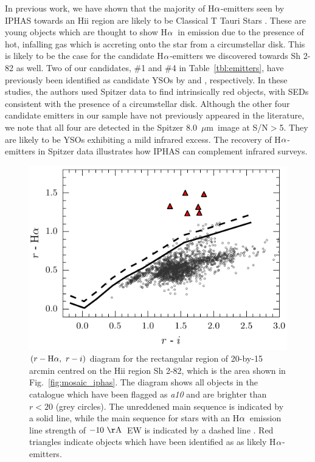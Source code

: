 \documentclass[a4paper,useAMS,usenatbib]{mn2e}
\def\ha{\mbox{H$\rm \alpha$}}
\def\micron{\mbox{$\mu$m}}
\begin{document}
In previous work, we have shown that the majority of
\ha-emitters seen by IPHAS towards an H{\sc ii} region
are likely to be Classical T Tauri Stars \citep{Barentsen2011a}.
These are young objects
which are thought to show \ha\ in emission
due to the presence of hot, infalling gas
which is accreting onto the star
from a circumstellar disk.
This is likely to be the case for the candidate \ha-emitters
we discovered towards Sh 2-82 as well.
Two of our candidates, \#1 and \#4 in Table~\ref{tbl:emitters},
have previously been identified
as candidate YSOs by \cite{Robitaille2008}
and \cite{Yu2012}, respectively.
In these studies, the authors used Spitzer data
to find intrinsically red objects,
with SEDs consistent with the presence of a circumstellar disk.
Although the other four candidate emitters in our sample
have not previously appeared in the literature,
we note that all four are detected
in the Spitzer 8.0~\micron\ image at S/N$>$5.
They are likely to be YSOs exhibiting a mild infrared excess.
The recovery of \ha-emitters in Spitzer
data illustrates how IPHAS can complement infrared surveys.

\begin{figure}
\begin{center}
  \includegraphics[width=\linewidth]{figures/sh2-82/sh2-82-ccd.pdf}
    \caption{$(r-\ha,\ r-i)$ diagram for the rectangular region of 
    20-by-15 arcmin centred on the H{\sc ii} region Sh 2-82,
    which is the area shown in Fig.~\ref{fig:mosaic_iphas}.    
    The diagram shows all objects in the catalogue
    which have been flagged as \emph{a10} and are brighter
    than $r<20$ (grey circles).
    The unreddened main sequence is indicated by a solid line,
    while the main sequence for stars with an \ha\ emission line
    strength of $-10~\rm{\AA}$~EW is indicated by a dashed line
    \citep[both based on the colour simulations by][]{Barentsen2011a}.
    Red triangles indicate objects which have been identified as
    as likely \ha-emitters.}
    \label{fig:emitters}
\end{center}
\end{figure}
\end{document}
